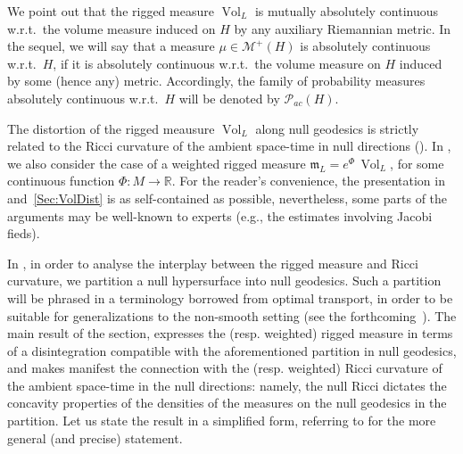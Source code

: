 \documentclass[12pt,a4paper]{amsart}
\theoremstyle{plain}
\theoremstyle{definition}
\numberwithin{equation}{section}
\newcommand{\R}{\mathbb{R}}
\DeclareMathOperator{\vol}{Vol}
\newcommand{\Prob}{\mathcal P}
\newcommand{\M}{\mathcal{M}}
\newcommand{\mm}{\mathfrak m}
\begin{document}
We point out that the rigged measure $\vol_L$ is mutually absolutely
continuous w.r.t.\ the volume measure induced on $H$ by any auxiliary Riemannian metric.
%
In the sequel, we will say that a measure $\mu\in\M^+(H)$ is
absolutely continuous w.r.t.\ $H$, if it is absolutely continuous
w.r.t.\ the volume measure on $H$ induced by some (hence any) metric.
%
Accordingly, the family of probability measures absolutely continuous w.r.t.\ $H$
will be denoted by $\Prob_{ac}(H)$.


The distortion of the rigged meausure $\vol_L$  along null geodesics is strictly related to the Ricci curvature of the ambient space-time in null directions (). In , we also consider the case of a weighted rigged measure $\mm_L= e^{\Phi} \,\vol_L$, for some continuous function $\Phi:M\to \R$.
%
For the reader's convenience, the presentation 
in~ and~\ref{Sec:VolDist} is as self-contained as
possible, nevertheless, some parts of the arguments may be well-known
to experts (e.g., the estimates involving Jacobi fieds).

In , in order to analyse the interplay between the rigged measure and Ricci curvature, we partition a null hypersurface into null geodesics. Such a partition will be phrased in a terminology borrowed from  optimal transport, in order to be suitable for generalizations to the non-smooth setting (see the forthcoming~\cite{CMM24b}). The main result of the section,  expresses the (resp. weighted) rigged measure in terms of a disintegration compatible with the aforementioned partition in null geodesics, and makes manifest the connection with the (resp. weighted) Ricci curvature of the ambient space-time in the null directions: namely, the null Ricci dictates the concavity properties of the densities of the measures on the null geodesics in the partition. Let us state the result in a simplified form, referring to   for the more general (and precise) statement. 
\end{document}
